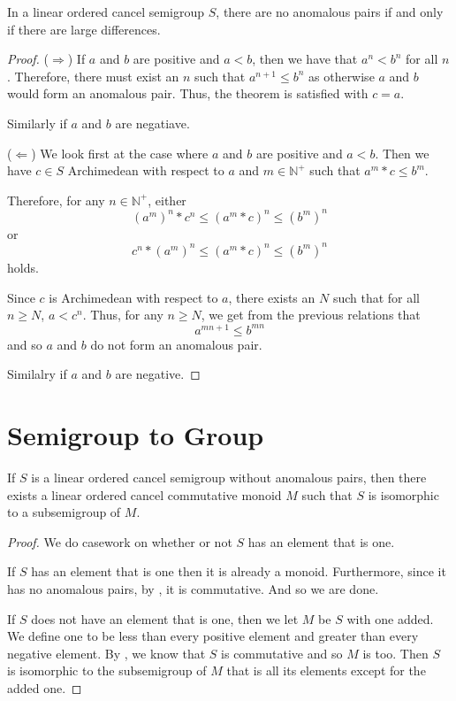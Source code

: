 \begin{theorem}\label{not_anomalous_iff_large_difference}
    \leanok
{}
In a linear ordered cancel semigroup $S$, there are no anomalous pairs
if and only if there are large differences.
\end{theorem}
\begin{proof}\leanok
($\Rightarrow$)
If $a$ and $b$ are positive and $a < b$, then we have that $a^n < b^n$ for all $n$.
Therefore, there must exist an $n$ such that $a^{n+1} \le b^n$
as otherwise $a$ and $b$ would form an anomalous pair.
Thus, the theorem is satisfied with $c = a$.

Similarly if $a$ and $b$ are negatiave.

($\Leftarrow$)
We look first at the case where $a$ and $b$ are positive and $a < b$.
Then we have $c\in S$ Archimedean with respect to $a$ and $m\in \mathbb{N}^+$ such that
$a^m * c \le b^m$.

Therefore, for any $n \in \mathbb{N}^+$,
either
\[(a^m)^n * c^n \le (a^m*c)^n \le (b^m)^n\]
or
\[c^n * (a^m)^n \le (a^m*c)^n \le (b^m)^n\]
holds.

Since $c$ is Archimedean with respect to $a$, there exists an $N$
such that for all $n \ge N$, $a < c^n$. Thus, for any $n \ge N$,
we get from the previous relations that
\[a^{mn + 1} \le b^{mn}\]
and so $a$ and $b$ do not form an anomalous pair.

Similalry if $a$ and $b$ are negative.
\end{proof}

\section{Semigroup to Group}

\begin{theorem}\label{to_not_anom_monoid}
    \leanok
    If $S$ is a linear ordered cancel semigroup
    without anomalous pairs, then there exists a
    linear ordered cancel commutative monoid $M$
    such that $S$ is isomorphic to a subsemigroup
    of $M$.
\end{theorem}
\begin{proof}\leanok
We do casework on whether or not $S$ has an element
that is one.

If $S$ has an element that is one then it is already
a monoid. Furthermore, since it has no anomalous pairs,
by , it is commutative.
And so we are done.

If $S$ does not have an element that is one,
then we let $M$ be $S$ with one added.
We define one to be less than every positive element and
greater than every negative element. By ,
we know that $S$ is commutative and so $M$ is too.
Then $S$ is isomorphic to the subsemigroup of $M$
that is all its elements except for the added one.
\end{proof}

